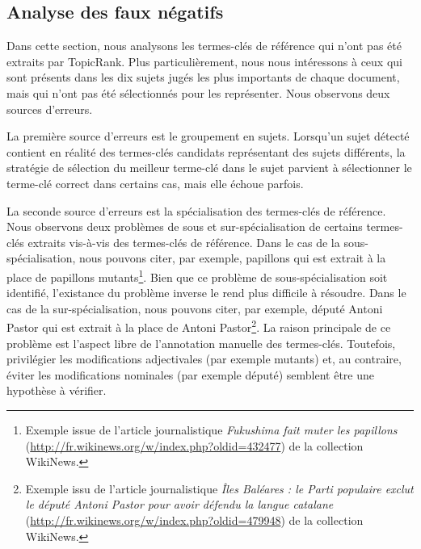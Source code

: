         \subsection{Analyse des faux négatifs}
        \label{subsec:main-automatic_keyphrase_annotation-unsupervised_automatic_keyphrase_extraction-error_analysis-false_negatives}
          Dans cette section, nous analysons les termes-clés de référence qui
          n'ont pas été extraits par TopicRank. Plus particulièrement, nous nous
          intéressons à ceux qui sont présents dans les dix sujets jugés les
          plus importants de chaque document, mais qui n'ont pas été
          sélectionnés pour les représenter. Nous observons deux sources
          d'erreurs.

          La première source d'erreurs est le groupement en sujets. Lorsqu'un
          sujet détecté contient en réalité des termes-clés candidats
          représentant des sujets différents, la stratégie de sélection du
          meilleur terme-clé dans le sujet parvient à sélectionner le terme-clé
          correct dans certains cas, mais elle échoue parfois.

          La seconde source d'erreurs est la spécialisation des termes-clés de
          référence. Nous observons deux problèmes de sous et sur-spécialisation
          de certains termes-clés extraits vis-à-vis des termes-clés de
          référence. Dans le cas de la sous-spécialisation, nous pouvons citer,
          par exemple, \og{}papillons\fg{} qui est extrait à la place de
          \og{}papillons mutants\fg{}\footnote{Exemple issue de l'article
          journalistique \textit{Fukushima fait muter les papillons}
          (\url{http://fr.wikinews.org/w/index.php?oldid=432477}) de la
          collection WikiNews.}. Bien que ce problème de sous-spécialisation
          soit identifié, l'existance du problème inverse le rend plus difficile
          à résoudre. Dans le cas de la sur-spécialisation, nous pouvons citer,
          par exemple, \og{}député Antoni Pastor\fg{} qui est extrait à la place
          de \og{}Antoni Pastor\fg{}\footnote{Exemple issu de l'article
          journalistique \textit{Îles Baléares : le Parti populaire exclut le
          député Antoni Pastor pour avoir défendu la langue catalane}
          (\url{http://fr.wikinews.org/w/index.php?oldid=479948}) de la
          collection WikiNews.}. La raison principale de ce problème est
          l'aspect libre de l'annotation manuelle des termes-clés. Toutefois,
          privilégier les modifications adjectivales (par exemple
          \og{}mutants\fg{}) et, au contraire, éviter les modifications
          nominales (par exemple \og{}député\fg{}) semblent être une hypothèse à
          vérifier.

